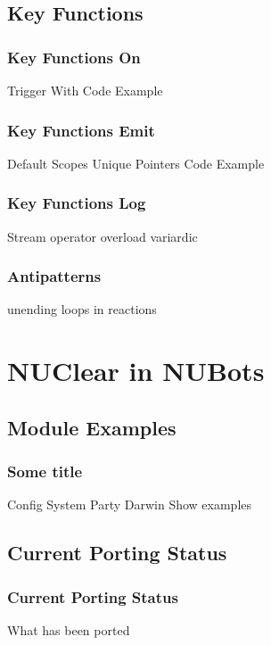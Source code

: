 \documentclass{beamer}
\begin{document}
\subsection{Key Functions}
\begin{frame}
    \frametitle{Key Functions On}
	Trigger
	With
	Code Example
\end{frame}

\begin{frame}
    \frametitle{Key Functions Emit}
	Default
	Scopes
	Unique Pointers
	Code Example
\end{frame}

\begin{frame}
    \frametitle{Key Functions Log}
	Stream operator overload
	variardic
\end{frame}

\begin{frame}
    \frametitle{Antipatterns}
	unending loops in reactions
\end{frame}

\section{NUClear in NUBots}
\subsection{Module Examples}
\begin{frame}
    \frametitle{Some title}
	Config System
	Party Darwin
	Show examples
\end{frame}

\subsection{Current Porting Status}
\begin{frame}
    \frametitle{Current Porting Status}
	What has been ported
\end{frame}
\end{document}
